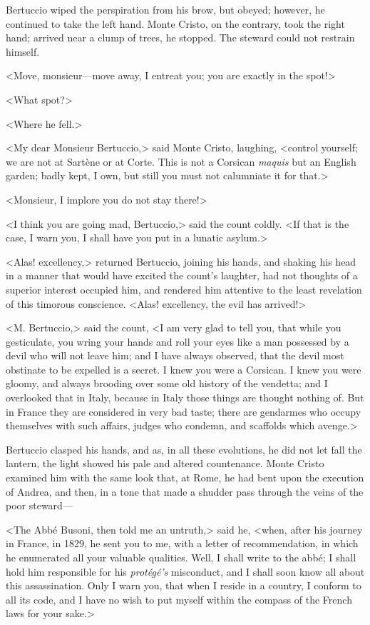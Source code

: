  Bertuccio wiped the perspiration from his brow, but obeyed; however, he continued to take the left hand. Monte Cristo, on the contrary, took the right hand; arrived near a clump of trees, he stopped. The steward could not restrain himself. 

 <Move, monsieur—move away, I entreat you; you are exactly in the spot!> 

 <What spot?> 

 <Where he fell.>

<My dear Monsieur Bertuccio,> said Monte Cristo, laughing, <control yourself; we are not at Sartène or at Corte. This is not a Corsican \textit{maquis} but an English garden; badly kept, I own, but still you must not calumniate it for that.> 

 <Monsieur, I implore you do not stay there!> 

 <I think you are going mad, Bertuccio,> said the count coldly. <If that is the case, I warn you, I shall have you put in a lunatic asylum.> 

 <Alas! excellency,> returned Bertuccio, joining his hands, and shaking his head in a manner that would have excited the count's laughter, had not thoughts of a superior interest occupied him, and rendered him attentive to the least revelation of this timorous conscience. <Alas! excellency, the evil has arrived!> 

 <M. Bertuccio,> said the count, <I am very glad to tell you, that while you gesticulate, you wring your hands and roll your eyes like a man possessed by a devil who will not leave him; and I have always observed, that the devil most obstinate to be expelled is a secret. I knew you were a Corsican. I knew you were gloomy, and always brooding over some old history of the vendetta; and I overlooked that in Italy, because in Italy those things are thought nothing of. But in France they are considered in very bad taste; there are gendarmes who occupy themselves with such affairs, judges who condemn, and scaffolds which avenge.> 

 Bertuccio clasped his hands, and as, in all these evolutions, he did not let fall the lantern, the light showed his pale and altered countenance. Monte Cristo examined him with the same look that, at Rome, he had bent upon the execution of Andrea, and then, in a tone that made a shudder pass through the veins of the poor steward— 

 <The Abbé Busoni, then told me an untruth,> said he, <when, after his journey in France, in 1829, he sent you to me, with a letter of recommendation, in which he enumerated all your valuable qualities. Well, I shall write to the abbé; I shall hold him responsible for his \textit{protégé's} misconduct, and I shall soon know all about this assassination. Only I warn you, that when I reside in a country, I conform to all its code, and I have no wish to put myself within the compass of the French laws for your sake.> 

